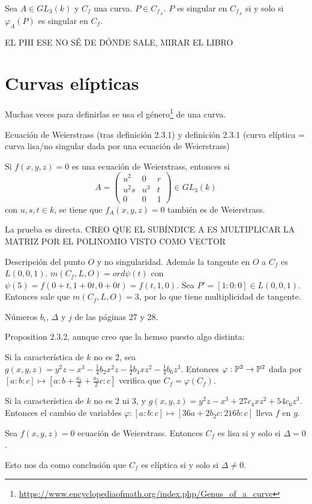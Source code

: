 \documentclass[CR.tex]{subfiles}
\begin{document}
\begin{lemma}
Sea $A\in GL_3(k)$ y $C_f$ una curva. $P\in C_{f_A}$. $P$ es singular en $C_{f_A}$ si y solo si $\varphi_A(P)$ es singular en $C_f$.  
\end{lemma}
EL PHI ESE NO SÉ DE DÓNDE SALE, MIRAR EL LIBRO

\section{Curvas elípticas}
Muchas veces para definirlas se usa el género\footnote{\url{https://www.encyclopediaofmath.org/index.php/Genus_of_a_curve}} de una curva. 

Ecuación de Weierstrass (tras definición 2.3.1) y definición 2.3.1 (curva elíptica = curva lisa/no singular dada por una ecuación de Weierstrass)

\begin{lemma}
Si $f(x,y,z)=0$ es una ecuación de Weierstrass, entonces si
\[
A=\begin{pmatrix}
u^2 & 0 & r\\
u^2s & u^3 & t\\
0 & 0 & 1
\end{pmatrix}\in GL_3(k)
\]
con $u,s,t\in k$, se tiene que $f_A(x,y,z)=0$ también es de Weierstrass.
\end{lemma}
La prueba es directa. CREO QUE EL SUBÍNDICE A ES MULTIPLICAR LA MATRIZ POR EL POLINOMIO VISTO COMO VECTOR

Descripción del punto $O$ y no singularidad. Además la tangente en $O$ a $C_f$ es $L(0,0,1)$. $m(C_f,L,O)=ord\psi(t)$ con $\psi(5)=f(0+t,1+0t,0+0t)=f(t,1,0)$. Sea $P'=[1:0:0]\in L(0,0,1)$. Entonces sale que $m(C_f,L,O)=3$, por lo que tiene multiplicidad de tangente. 

Números $b_i$, $\Delta$ y $j$ de las páginas 27 y 28. 


Proposition 2.3.2, aunque creo que la hemso puesto algo distinta:

\begin{lemma}
Si la característica de $k$ no es 2, sea $g(x,y,z)=y^2z-x^3-\frac{1}{4}b_2x^2z-\frac{1}{2}b_4xz^2-\frac{1}{4}b_6z^3$. Entonces $\varphi:\mathbb{P}^2\to \mathbb{P}^2$ dada por $[a:b:c]\mapsto [a:b+\frac{a_1}{2}+\frac{a_3}{2}c:c]$ verifica que $C_f=\varphi(C_f)$.
\end{lemma}

\begin{lemma}[en la página 26]
Si la característica de $k$ no es 2 ni 3, y $g(x,y,z)=y^2z-x^3+27c_4xz^2+54c_6z^3$. Entonces el cambio de variables $\varphi:[a:b:c]\mapsto [36a+2b_2c:216b:c]$ lleva $f$ en $g$. 
\end{lemma}

\begin{prop}[2.3.3]
Sea $f(x,y,z)=0$ ecuación de Weierstrass. Entonces $C_f$ es lisa si y solo si $\Delta=0$.
\end{prop}

Esto nos da como conclusión que $C_f$ es elíptica si y solo si $\Delta\neq 0$.
\end{document}
